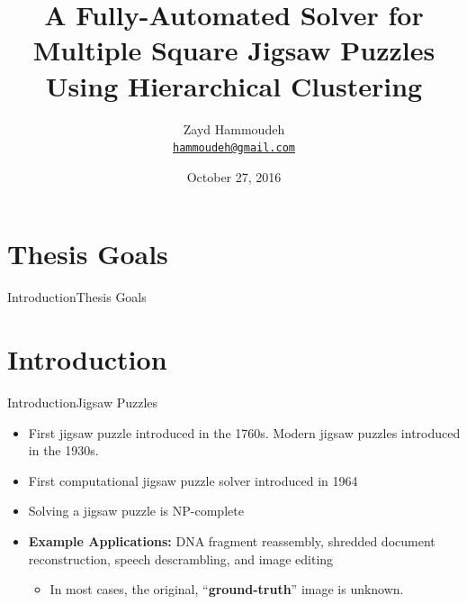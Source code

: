 \documentclass[10pt]{beamer}
\title[A Fully-Automated Solver for Multiple Square Jigsaw Puzzles Using Hierarchical Clustering]%
{\textbf{A Fully-Automated Solver for Multiple Square Jigsaw Puzzles Using Hierarchical Clustering}}
\subtitle{}  %
\date{October 27, 2016}
\author[Zayd Hammoudeh] %
{
    Zayd Hammoudeh\\
    \href{mailto:hammoudeh@gmail.com}{{\tt hammoudeh@gmail.com}}
}
\institute[
    Dept.\ of Computer Science\\
    San Jos\'{e} State University\\
] %
{%
    Department of Computer Science\\
    San Jos\'{e} State University\\
  
}
\begin{document}
{
\begin{frame}{}{} %
	\titlepage
\end{frame}}






\section{Thesis Goals}
\begin{frame}{Introduction}{Thesis Goals}
\end{frame}



\section{Introduction}
\begin{frame}{Introduction}{Jigsaw Puzzles}
  \begin{itemize}
    \item First jigsaw puzzle introduced in the 1760s.  Modern jigsaw puzzles introduced in the 1930s.
    \vfill
    \item First computational jigsaw puzzle solver introduced in 1964
    \vfill
    \item Solving a jigsaw puzzle is NP-complete~\cite{altman1990, demaine2007}
    \vfill
    \item<2-> \textbf{Example Applications:} DNA fragment reassembly, shredded document reconstruction, speech descrambling, and image editing
    \begin{itemize}
        \item<3-> In most cases, the original, ``{\color{spartanBlue}\textbf{ground-truth}}'' image is unknown.
    \end{itemize}
  \end{itemize}
\end{frame}
\end{document}
